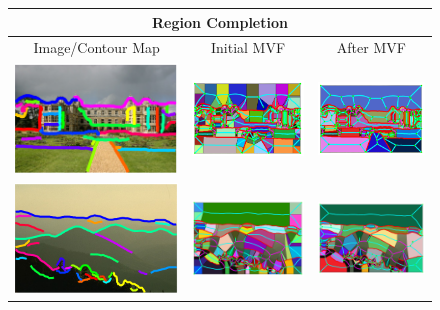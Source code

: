 \begin{figure}[!ht]
\centering
\setlength{\tabcolsep}{2pt}
\begin{tabular}{|c|c|c|}
\hline        
\multicolumn{3}{|c|}{Region Completion}\\
\hline
Image/Contour Map  & Initial MVF & After MVF \\
\hline
\includegraphics[width=0.33\linewidth]{figs/3_1_s_00_cons.pdf} &
\includegraphics[width=0.33\linewidth]{figs/3_1_s_00_type1_atomic_frags.pdf} &
\includegraphics[width=0.33\linewidth]{figs/3_1_s_00_mvf_frags.pdf}\\
\hline
\includegraphics[width=0.33\linewidth]{figs/55067_00_cons.pdf} &
\includegraphics[width=0.33\linewidth]{figs/55067_00_type1_atomic_frags.pdf} &
\includegraphics[width=0.33\linewidth]{figs/55067_00_mvf_frags.pdf}\\

\end{tabular}
\end{figure}

